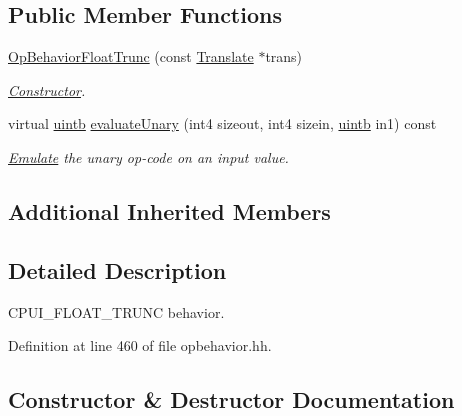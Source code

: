 \subsection*{Public Member Functions}
\begin{DoxyCompactItemize}
\item 
\mbox{\hyperlink{class_op_behavior_float_trunc_a288319ed31b386eb09e0807436151fbb}{Op\+Behavior\+Float\+Trunc}} (const \mbox{\hyperlink{class_translate}{Translate}} $\ast$trans)
\begin{DoxyCompactList}\small\item\em \mbox{\hyperlink{class_constructor}{Constructor}}. \end{DoxyCompactList}\item 
virtual \mbox{\hyperlink{types_8h_a2db313c5d32a12b01d26ac9b3bca178f}{uintb}} \mbox{\hyperlink{class_op_behavior_float_trunc_adccaabdda58924e02be946eabeaffe3f}{evaluate\+Unary}} (int4 sizeout, int4 sizein, \mbox{\hyperlink{types_8h_a2db313c5d32a12b01d26ac9b3bca178f}{uintb}} in1) const
\begin{DoxyCompactList}\small\item\em \mbox{\hyperlink{class_emulate}{Emulate}} the unary op-\/code on an input value. \end{DoxyCompactList}\end{DoxyCompactItemize}
\subsection*{Additional Inherited Members}


\subsection{Detailed Description}
C\+P\+U\+I\+\_\+\+F\+L\+O\+A\+T\+\_\+\+T\+R\+U\+NC behavior. 

Definition at line 460 of file opbehavior.\+hh.



\subsection{Constructor \& Destructor Documentation}
\mbox{\label{class_op_behavior_float_trunc_a288319ed31b386eb09e0807436151fbb}} 

